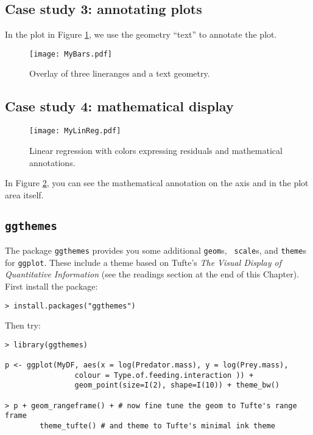 \subsection{Case study 3: annotating plots}

In the plot in Figure \ref{Linebar}, we use the geometry ``text'' to
annotate the plot.


\begin{figure}
	\begin{center}
	\texttt{[image: MyBars.pdf]}
	\end{center}
	\caption{Overlay of three lineranges and a text geometry.}
	\label{Linebar}
\end{figure}

\subsection{Case study 4: mathematical display}

\begin{figure}
	\begin{center}
	\texttt{[image: MyLinReg.pdf]}
	\end{center}
	\caption{Linear regression with colors expressing residuals and
	mathematical annotations.}
	\label{LinReg}
\end{figure}

In Figure \ref{LinReg}, you can see the mathematical annotation on the
axis and in the plot area itself.

\subsection{\tt ggthemes}

The package {\tt ggthemes} provides you some additional {\tt geom}s, {\tt 
scale}s, and {\tt theme}s for {\tt ggplot}. These include a theme based 
on Tufte's {\it The Visual Display of Quantitative Information} (see 
the readings section at the end of this Chapter). First install the 
package:

\begin{lstlisting}
> install.packages("ggthemes")
\end{lstlisting}

Then try:

\begin{lstlisting}	
> library(ggthemes)

p <- ggplot(MyDF, aes(x = log(Predator.mass), y = log(Prey.mass),
				colour = Type.of.feeding.interaction )) +
				geom_point(size=I(2), shape=I(10)) + theme_bw()

> p + geom_rangeframe() + # now fine tune the geom to Tufte's range frame
		theme_tufte() # and theme to Tufte's minimal ink theme    
\end{lstlisting}


